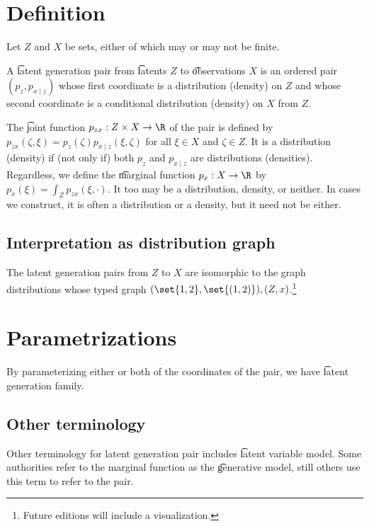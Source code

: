 
\section*{Definition}

Let $Z$ and $X$ be sets, either of which may or may not be finite.

A \t{latent generation pair} from \t{latents} $Z$ to \t{observations} $X$ is an ordered pair $(p_z, p_{x \mid z})$ whose first coordinate is a distribution (density) on $Z$ and whose second coordinate is a conditional distribution (density) on $X$ from $Z$.

The \t{joint function} $p_{zx}: Z \times X \to \R $ of the pair is defined by $p_{zx}(\zeta , \xi ) = p_{z}(\zeta )p_{x \mid z}(\xi , \zeta )$ for all $\xi  \in X$ and $\zeta  \in Z$.
It is a distribution (density) if (not only if) both $p_{z}$ and $p_{x \mid z}$ are distributions (densities).
Regardless, we define the \t{marginal function} $p_x: X \to \R $ by $p_x(\xi ) = \int_Z p_{zx}(\xi , \cdot )$.
It too may be a distribution, density, or neither.
In cases we construct, it is often a distribution or a density, but it need not be either.

\subsection*{Interpretation as distribution graph}

The latent generation pairs from $Z$ to $X$ are isomorphic to the graph distributions whose typed graph $(\set{1, 2}, \set{(1,2)}), (Z, x)$.\footnote{Future editions will include a visualization.}

\section*{Parametrizations}

By parameterizing either or both of the coordinates of the pair, we have \t{latent generation family}.

\subsection*{Other terminology}

Other terminology for latent generation pair includes \t{latent variable model}.
Some authorities refer to the marginal function as the \t{generative model}, still others use this term to refer to the pair.


\blankpage